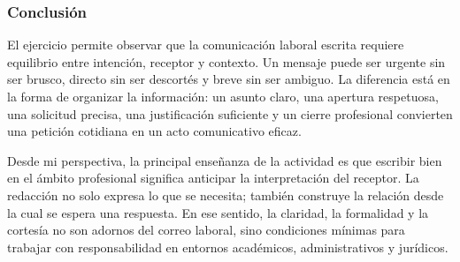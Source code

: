 \subsubsection{Conclusión}

El ejercicio permite observar que la comunicación laboral escrita requiere equilibrio entre intención, receptor y contexto. Un mensaje puede ser urgente sin ser brusco, directo sin ser descortés y breve sin ser ambiguo. La diferencia está en la forma de organizar la información: un asunto claro, una apertura respetuosa, una solicitud precisa, una justificación suficiente y un cierre profesional convierten una petición cotidiana en un acto comunicativo eficaz.

Desde mi perspectiva, la principal enseñanza de la actividad es que escribir bien en el ámbito profesional significa anticipar la interpretación del receptor. La redacción no solo expresa lo que se necesita; también construye la relación desde la cual se espera una respuesta. En ese sentido, la claridad, la formalidad y la cortesía no son adornos del correo laboral, sino condiciones mínimas para trabajar con responsabilidad en entornos académicos, administrativos y jurídicos.

